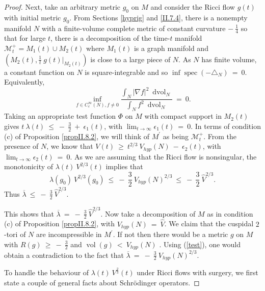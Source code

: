 \documentclass[12pt]{amsart}
\newcommand{\dvol}{\operatorname{dvol}}
\newcommand{\M}{{\mathcal M}}
\newcommand{\spec}{\operatorname{spec}}
\newcommand{\vol}{\operatorname{vol}}
\numberwithin{equation}{section}
\theoremstyle{plain}
\theoremstyle{definition}
\theoremstyle{remark}
\begin{document}
\begin{proof}
Next, take an arbitrary metric
$g_0$ on $M$ and consider the Ricci flow $g(t)$ with initial metric $g_0$.
From Sections \ref{hyprig} and \ref{II.7.4}, there is a
nonempty manifold $N$ with a finite-volume complete metric
of constant curvature $- \: \frac14$
so that for large $t$, there is a decomposition of the time-$t$ manifold
$\M^+_t = M_1(t) \cup M_2(t)$
where $M_1(t)$ is a graph manifold and $(M_2(t), \frac{1}{t} \: g(t) \big|_{M_2(t)})$
is close to a large
piece of $N$.
As $N$ has finite volume, a constant function on $N$ is square-integrable
and so  $\inf \spec(- \triangle_N) \: = \: 0$.
Equivalently,
\begin{equation}
\inf_{f \in C^\infty_c(N), f \neq 0}
\frac{\int_N |\nabla f|^2 \: \dvol_N}{\int_N f^2 \: \dvol_N} \: = \: 0.
\end{equation}
Taking an appropriate test function $\Phi$ on $M$ with compact
support in $M_2(t)$
gives $t \: \lambda(t) \: \le \: - \:
\frac32 \: + \: \epsilon_1(t)$, with $\lim_{t \rightarrow \infty}
\epsilon_1(t) \: = \: 0$. In terms of condition (c) of Proposition \ref{propII.8.2},
we will think of $M^\prime$ as being $\M^+_t$.
From the presence of $N$, we know that $V(t) \: \ge \:
t^{2/3} \: V_{hyp}(N) \: - \: \epsilon_2(t)$, with $\lim_{t \rightarrow \infty}
\epsilon_2(t) \: = \: 0$. As we are assuming that the Ricci flow is nonsingular,
the monotonicity of
$\lambda(t) \: V^{2/3}(t)$ implies that
\begin{equation}
\lambda(g_0) \: V^{2/3}(g_0) \: \le \: - \: \frac32 \: V_{hyp}(N)^{2/3}
 \: \le \: - \: \frac32 \: \widehat{V}^{2/3}.
 \end{equation}
Thus $\overline{\lambda} \: \le \: - \: \frac32 \: \widehat{V}^{2/3}$.

This shows that 
$\overline{\lambda} \: = \: - \: \frac32 \: \widehat{V}^{2/3}$.
Now take a decomposition of $M$ as in condition (c) of Proposition \ref{propII.8.2},
with
$V_{hyp}(N) \: = \: \widehat{V}$. We claim that the cuspidal $2$-tori of $N$ are
incompressible in $M^\prime$. If not 
then there would be a metric $g$ on $M$ with $R(g) \: \ge \: - \: \frac32$ and
$\vol(g) \: < \: V_{hyp}(N)$ \cite[Pf. of Theorem 2.9]{Anderson}. 
Using (\ref{test}), one
would obtain a contradiction to the fact that  
$\overline{\lambda} \: = \: - \: \frac32 \: V_{hyp}(N)^{2/3}$.
 
To handle the behaviour of $\lambda(t) \: V^{\frac23}(t)$ under
Ricci flows with surgery, we 
first state a couple of general facts about
Schr\"odinger operators.


\end{proof}
\end{document}
